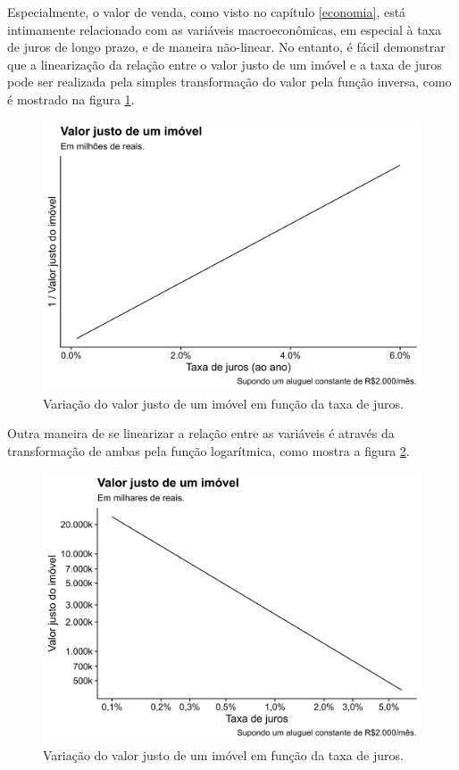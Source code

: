 \documentclass[
	12pt,				%
	oneside,			%
	a4paper,			%
	chapter=TITLE,		%
	section=TITLE,		%
	english,			%
	brazil				%
	]{abntex2}
\begin{document}
Especialmente, o valor de venda, como visto no capítulo \ref{economia},
está intimamente relacionado com as variáveis macroeconômicas, em
especial à taxa de juros de longo prazo, e de maneira não-linear. No
entanto, é fácil demonstrar que a linearização da relação entre o valor
justo de um imóvel e a taxa de juros pode ser realizada pela simples
transformação do valor pela função inversa, como é mostrado na figura
\ref{fig:valores-juros-rec}.
\begin{figure}[H]

{\centering \includegraphics[width=0.7\linewidth]{images/valores-juros-rec-1} 

}

\caption{Variação do valor justo de um imóvel em função da taxa de juros.}\label{fig:valores-juros-rec}
\end{figure}
Outra maneira de se linearizar a relação entre as variáveis é através da
transformação de ambas pela função logarítmica, como mostra a figura
\ref{fig:valores-juros-log}.
\begin{figure}[H]

{\centering \includegraphics[width=0.7\linewidth]{images/valores-juros-log-1} 

}

\caption{Variação do valor justo de um imóvel em função da taxa de juros.}\label{fig:valores-juros-log}
\end{figure}
\end{document}
